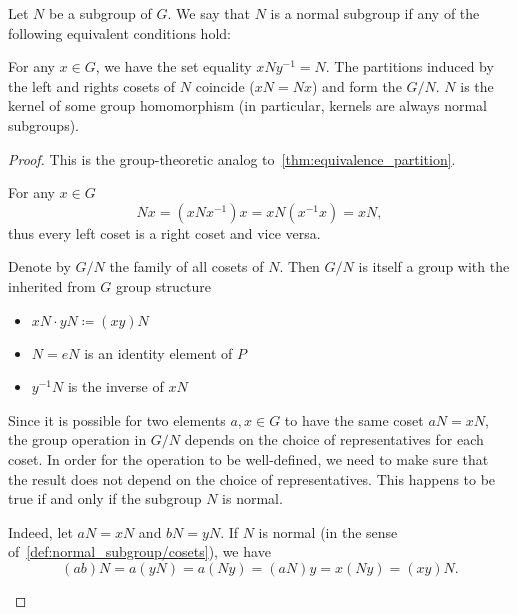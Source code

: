 \begin{definition}\label{def:normal_subgroup}
  Let \( N \) be a subgroup of \( G \). We say that \( N \) is a normal subgroup if any of the following equivalent conditions hold:
  \begin{defenum}
     For any \( x \in G \), we have the set equality \( x N y^{-1} = N \).
     The partitions induced by the left and rights cosets of \( N \) coincide (\( xN = Nx \)) and form the  \( G / N \).
     \( N \) is the kernel of some group homomorphism (in particular, kernels are always normal subgroups).
  \end{defenum}
\end{definition}
\begin{proof}
  This is the group-theoretic analog to~\cref{thm:equivalence_partition}.

  \begin{description}
     For any \( x \in G \)
    \begin{equation*}
      Nx = (xNx^{-1})x = xN(x^{-1}x) = xN,
    \end{equation*}
    thus every left coset is a right coset and vice versa.

     Denote by \( G / N \) the family of all cosets of \( N \). Then \( G / N \) is itself a group with the inherited from \( G \) group structure
    \begin{itemize}
      \item \( xN \cdot yN \coloneqq (xy)N \)
      \item \( N = eN \) is an identity element of \( P \)
      \item \( y^{-1} N \) is the inverse of \( xN \)
    \end{itemize}

    Since it is possible for two elements \( a, x \in G \) to have the same coset \( aN = xN \), the group operation in \( G / N \) depends on the choice of representatives for each coset. In order for the operation to be well-defined, we need to make sure that the result does not depend on the choice of representatives. This happens to be true if and only if the subgroup \( N \) is normal.

    Indeed, let \( aN = xN \) and \( bN = yN \). If \( N \) is normal (in the sense of~\ref{def:normal_subgroup/cosets}), we have
    \begin{equation*}
      (ab)N = a(yN) = a(Ny) = (aN)y = x(Ny) = (xy)N.
    \end{equation*}


\end{description}
\end{proof}

